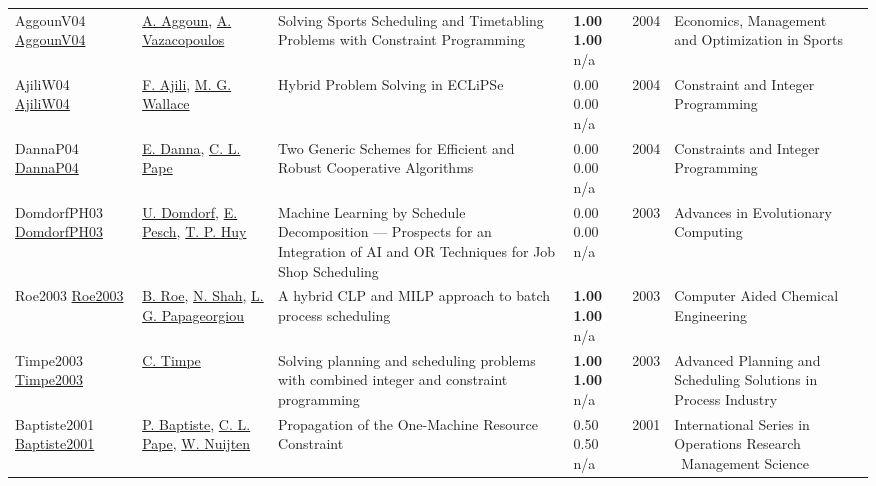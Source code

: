 {\begin{longtable}{p{3cm}p{5cm}p{10cm}p{1cm}rp{2.5cm}l}
AggounV04 \href{http://dx.doi.org/10.1007/978-3-540-24734-0_15}{AggounV04} & \hyperref[auth:a724]{A. Aggoun}, \hyperref[auth:a906]{A. Vazacopoulos} & Solving Sports Scheduling and Timetabling Problems with Constraint Programming & \noindent{}\textbf{1.00} \textbf{1.00} n/a & 2004 & Economics, Management and Optimization in Sports & \cite{AggounV04}\\
AjiliW04 \href{http://dx.doi.org/10.1007/978-1-4419-8917-8_6}{AjiliW04} & \hyperref[auth:a948]{F. Ajili}, \hyperref[auth:a117]{M. G. Wallace} & Hybrid Problem Solving in ECLiPSe & \noindent{}\textcolor{black!50}{0.00} \textcolor{black!50}{0.00} n/a & 2004 & Constraint and Integer Programming & \cite{AjiliW04}\\
DannaP04 \href{http://dx.doi.org/10.1007/978-1-4419-8917-8_2}{DannaP04} & \hyperref[auth:a287]{E. Danna}, \hyperref[auth:a163]{C. L. Pape} & Two Generic Schemes for Efficient and Robust Cooperative Algorithms & \noindent{}\textcolor{black!50}{0.00} \textcolor{black!50}{0.00} n/a & 2004 & Constraints and Integer Programming & \cite{DannaP04}\\
DomdorfPH03 \href{http://dx.doi.org/10.1007/978-3-642-18965-4_31}{DomdorfPH03} & \hyperref[auth:a958]{U. Domdorf}, \hyperref[auth:a437]{E. Pesch}, \hyperref[auth:a959]{T. P. Huy} & Machine Learning by Schedule Decomposition — Prospects for an Integration of AI and OR Techniques for Job Shop Scheduling & \noindent{}\textcolor{black!50}{0.00} \textcolor{black!50}{0.00} n/a & 2003 & Advances in Evolutionary Computing & \cite{DomdorfPH03}\\
Roe2003 \href{http://dx.doi.org/10.1016/s1570-7946(03)80608-9}{Roe2003} & \hyperref[auth:a1240]{B. Roe}, \hyperref[auth:a1242]{N. Shah}, \hyperref[auth:a1241]{L. G. Papageorgiou} & A hybrid CLP and MILP approach to batch process scheduling & \noindent{}\textbf{1.00} \textbf{1.00} n/a & 2003 & Computer Aided Chemical Engineering & \cite{Roe2003}\\
Timpe2003 \href{http://dx.doi.org/10.1007/978-3-662-05607-3_5}{Timpe2003} & \hyperref[auth:a672]{C. Timpe} & Solving planning and scheduling problems with combined integer and constraint programming & \noindent{}\textbf{1.00} \textbf{1.00} n/a & 2003 & Advanced Planning and Scheduling Solutions in Process Industry & \cite{Timpe2003}\\
Baptiste2001 \href{http://dx.doi.org/10.1007/978-1-4615-1479-4_2}{Baptiste2001} & \hyperref[auth:a162]{P. Baptiste}, \hyperref[auth:a163]{C. L. Pape}, \hyperref[auth:a655]{W. Nuijten} & Propagation of the One-Machine Resource Constraint & \noindent{}0.50 0.50 n/a & 2001 & International Series in Operations Research \  Management Science & \cite{Baptiste2001}\\

\end{longtable}}
